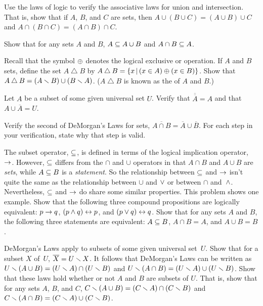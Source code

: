 \begin{exercises}

\problem Use the laws of logic to verify the associative laws for
union and intersection.  That is, show that if $A$, $B$, and $C$ are
sets, then $A\cup(B\cup C)= (A\cup B)\cup C$ and
$A\cap(B\cap C)= (A\cap B)\cap C$.

\problem Show that for any sets $A$ and $B$, $A\subseteq A\cup B$
and $A\cap B\subseteq A$.

\problem Recall that the symbol $\oplus$ denotes the logical
exclusive or operation.  If $A$ and $B$ sets, define the
set $A\bigtriangleup B$ by $A\bigtriangleup B = \{x\,|\, (x\in A)\oplus (x\in B)\}$.
Show that $A\bigtriangleup B = (A\smallsetminus B)\cup(B\smallsetminus A)$.
($A\bigtriangleup B$ is known as the  of
$A$ and $B$.)

\problem Let $A$ be a subset of some given universal set $U$.
Verify that $\overline{\overline{A}}=A$ and that
$A\cup\overline{A}=U$.

\problem Verify the second of DeMorgan's Laws for sets, 
$\overline{A\cap B}=\overline{A}\cup\overline{B}$.  For each step
in your verification, state why that step is valid.

\problem The subset operator, $\subseteq$, is defined in terms of
the logical implication operator,~$\rightarrow$.  However, $\subseteq$
differs from the $\cap$ and $\cup$ operators in that $A\cap B$ 
and $A\cup B$ are \emph{sets}, while $A\subseteq B$ is a \emph{statement}.
So the relationship between $\subseteq$ and $\rightarrow$ isn't quite the same
as the relationship between $\cup$ and $\vee$ or between $\cap$ and~$\wedge$.
Nevertheless, $\subseteq$ and $\rightarrow$ do share some similar properties.
This problem shows one example.
\ppart Show that the following three compound propositions are
logically equivalent: $p\rightarrow q$, $(p\wedge q)\leftrightarrow p$, and $(p\vee q)\leftrightarrow q$.
\ppart Show that for any sets $A$ and $B$, the following three statements
are equivalent: $A\subseteq B$, $A\cap B = A$, and $A\cup B = B$.

\problem DeMorgan's Laws apply to subsets of some given universal
set~$U$.  Show that for a subset $X$ of~$U$, $\overline{X}=U\smallsetminus X$.
It follows that DeMorgan's Laws can be written as
$U\smallsetminus(A\cup B)=(U\smallsetminus A)\cap(U\smallsetminus B)$ and
$U\smallsetminus(A\cap B)=(U\smallsetminus A)\cup(U\smallsetminus B)$.  Show that
these laws hold whether or not $A$ and $B$ are subsets of $U$.
That is, show that for any sets $A$, $B$, and $C$,
$C\smallsetminus(A\cup B)=(C\smallsetminus A)\cap(C\smallsetminus B)$ and
$C\smallsetminus(A\cap B)=(C\smallsetminus A)\cup(C\smallsetminus B)$.  



\end{exercises}
